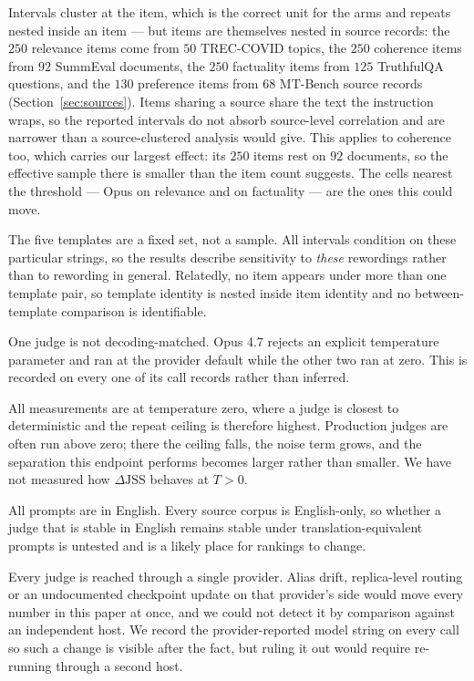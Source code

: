 Intervals cluster at the item, which is the correct unit for the arms and repeats
nested inside an item --- but items are themselves nested in source records: the
$250$ relevance items come from $50$ TREC-COVID topics, the $250$ coherence items
from $92$ SummEval documents, the $250$ factuality items from $125$ TruthfulQA
questions, and the $130$ preference items from $68$ MT-Bench source records
(Section~\ref{sec:sources}). Items sharing a source share the text the
instruction wraps, so the reported intervals do not absorb source-level
correlation and are narrower than a source-clustered analysis would give. This
applies to coherence too, which carries our largest effect: its $250$ items rest
on $92$ documents, so the effective sample there is smaller than the item count
suggests. The cells nearest the threshold --- Opus on relevance and on
factuality --- are the ones this could move.

The five templates are a fixed set, not a sample. All intervals condition on
these particular strings, so the results describe sensitivity to \emph{these}
rewordings rather than to rewording in general. Relatedly, no item appears under
more than one template pair, so template identity is nested inside item identity
and no between-template comparison is identifiable.

One judge is not decoding-matched. Opus 4.7 rejects an explicit temperature
parameter and ran at the provider default while the other two ran at zero. This
is recorded on every one of its call records rather than inferred.

All measurements are at temperature zero, where a judge is closest to
deterministic and the repeat ceiling is therefore highest. Production judges are
often run above zero; there the ceiling falls, the noise term grows, and the
separation this endpoint performs becomes larger rather than smaller. We have not
measured how $\Delta\mathrm{JSS}$ behaves at $T > 0$.

All prompts are in English. Every source corpus is English-only, so whether a
judge that is stable in English remains stable under translation-equivalent
prompts is untested and is a likely place for rankings to change.

Every judge is reached through a single provider. Alias drift, replica-level
routing or an undocumented checkpoint update on that provider's side would move
every number in this paper at once, and we could not detect it by comparison
against an independent host. We record the provider-reported model string on
every call so such a change is visible after the fact, but ruling it out would
require re-running through a second host.
